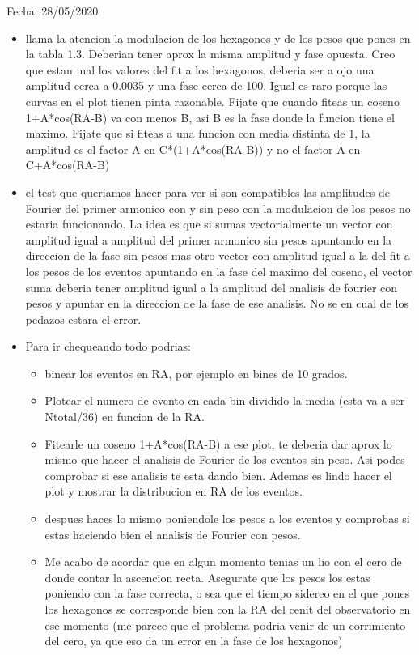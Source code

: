 Fecha: 28/05/2020

\begin{itemize}
	\item llama la atencion la modulacion de los hexagonos y de los pesos que pones en la tabla 1.3. Deberian tener aprox la misma amplitud y fase opuesta. Creo que estan mal los valores del fit a los hexagonos, deberia ser a ojo una amplitud cerca a 0.0035 y una fase cerca de 100. Igual es raro porque las curvas en el plot tienen pinta razonable. Fijate que cuando fiteas un coseno 1+A*cos(RA-B) va con menos B, asi B es la fase donde la funcion tiene el maximo. Fijate que si fiteas a una funcion con media distinta de 1, la amplitud es el factor A en C*(1+A*cos(RA-B)) y  no el factor  A en C+A*cos(RA-B)

	\item  el test que queriamos hacer para ver si son compatibles las amplitudes de Fourier del primer armonico con y sin peso con la modulacion de los pesos no estaria funcionando. La idea es que si sumas vectorialmente un vector con amplitud igual a amplitud del primer armonico sin pesos apuntando en la direccion de la fase sin pesos mas otro vector con amplitud igual a la del fit a los pesos de los eventos apuntando en la fase del maximo del coseno, el vector suma deberia tener amplitud igual a la amplitud del analisis de fourier con pesos y apuntar en la direccion de la fase de ese analisis. No se en cual de los pedazos estara el error.
	
	\item Para ir chequeando todo podrias:

	\begin{itemize}
	
		\item  binear los eventos en RA, por ejemplo en bines de 10 grados. 
		
		\item Plotear el numero de evento en cada bin dividido la media (esta va a ser Ntotal/36) en funcion de la RA. 
		
		\item Fitearle un coseno 1+A*cos(RA-B) a ese plot, te deberia dar aprox lo mismo que hacer el analisis de Fourier de los eventos sin peso. Asi podes comprobar si ese analisis te esta dando bien. Ademas es lindo hacer el plot y mostrar la distribucion en RA de los eventos.

		\item  despues haces lo mismo poniendole los pesos a los eventos y comprobas si estas haciendo bien el analisis de Fourier con pesos.
	
		\item  Me acabo de acordar que en algun momento tenias un lio con el  cero de donde contar la ascencion recta. Asegurate que los pesos los estas poniendo con la fase correcta, o sea que el tiempo sidereo en el que pones los hexagonos se corresponde bien con la RA del cenit del observatorio en ese momento (me parece que el problema podria venir de un corrimiento del cero, ya que eso da un error en la fase de los hexagonos)
	\end{itemize}
\end{itemize}


